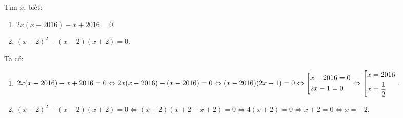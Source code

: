 \begin{ex}%
	Tìm $x$, biết:
	\begin{multicols}{2}
		\begin{enumerate}
			\item $2x(x-2016)-x+2016=0$.
			\item $(x+2)^2-(x-2)(x+2)=0$.
		\end{enumerate}
	\end{multicols}
	\loigiai
	{
		Ta có:
		\begin{enumerate}
			\item $2x(x-2016)-x+2016=0 \Leftrightarrow 2x(x-2016)-(x-2016)=0 \Leftrightarrow (x-2016)(2x-1)=0 \\
			\Leftrightarrow \left[\begin{aligned}
				& x-2016=0 \\ & 2x-1=0
			\end{aligned}\right. \Leftrightarrow \left[\begin{aligned}
				& x=2016 \\ & x=\frac{1}{2}
			\end{aligned}\right.$.
			\item $(x+2)^2-(x-2)(x+2)=0 \Leftrightarrow (x+2)(x+2-x+2)=0 \Leftrightarrow 4(x+2)=0 \Leftrightarrow x+2=0 \Leftrightarrow x=-2$.
		\end{enumerate}
	}
\end{ex}

